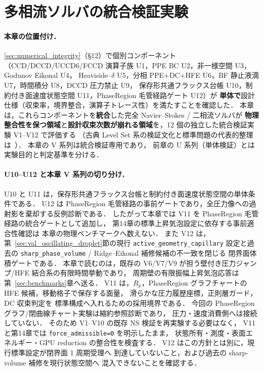 %
\section{多相流ソルバの統合検証実験}
\label{sec:verification}

\paragraph{本章の位置付け．}
\autoref{sec:numerical_integrity}（§12）で個別コンポーネント
（CCD/DCCD/UCCD6/FCCD 演算子族 U1，PPE BC U2，非一様空間 U3，Godunov Eikonal U4，
Heaviside--$\delta$ U5，分相 PPE+DC+HFE U6，BF 静止液滴 U7，時間積分 U8，DCCD 圧力禁止 U9，
保存形共通フラックス台帳 U10，制約付き面速度状態空間 U11，PhaseRegion 毛管経路ゲート U12）が
\textbf{単体で}設計仕様（収束率，境界整合，演算子トレース性）を満たすことを確認した．
本章は，これらコンポーネントを\textbf{統合}した完全 Navier--Stokes / 二相流ソルバが
\textbf{物理整合性を保つ領域}と\textbf{設計収束次数が崩れる領域}を，12 個の独立した統合検証実験
V1--V12 で評価する
（古典 Level Set 系の検証文化と標準問題の代表的整理は~\cite{OsherFedkiw2003,Sethian1999,Hysing2009,AlandVoigt2012}）．
本章の V 系列は統合検証専用であり，
前章の U 系列（単体検証）とは実験目的と判定基準を分ける．

\paragraph{U10--U12 と本章 V 系列の切り分け．}
U10 と U11 は，保存形共通フラックス台帳と制約付き面速度状態空間の単体条件である．
U12 は PhaseRegion 毛管経路の事前ゲートであり，全圧力像への過射影を棄却する反例診断である．
したがって本章では V11 を PhaseRegion 毛管経路の統合ゲートとして追加し，
第14章の標準上昇気泡設定に依存する事前適合性確認は
本章の物理ベンチマークへ数えない．
また V12 は，第~\ref{sec:val_oscillating_droplet}節の現行
\texttt{active\_geometry\_capillary} 設定と過去の
\texttt{sharp\_phase\_volume} / Ridge--Eikonal 補修候補の不一致を閉じる
閉界面体積ゲートである．
本章で読むのは，既存の V6/V7/V9 が担う壁付き圧力ジャンプ/HFE 結合系の有限時間挙動であり，
周期壁の有限振幅上昇気泡応答は第~\ref{sec:benchmarks}章へ送る．
V11 は，$R_p$，PhaseRegion グラフチャートの HFE 候補，移動格子で保存する面量，
滑らかな圧力履歴座標，正則層ガード，DC 収束判定を
標準構成へ入れるための採用境界である．
今回の PhaseRegion グラフ/閉曲線チャート実験は縮約参照診断であり，
圧力・速度消費側へは接続していない．
そのため V1--V10 の既存 NS 検証を再実験する必要はなく，
V11 と第14章では \texttt{force\_admissible=0} を明示したまま，
状態所有・測度・表面エネルギー・GPU reduction の整合性を検査する．
V12 はこの方針とは別に，現行標準設定が閉界面 1 周期受理へ
到達していないこと，および過去の sharp-volume 補修を現行状態空間へ
混入できないことを確認する．

